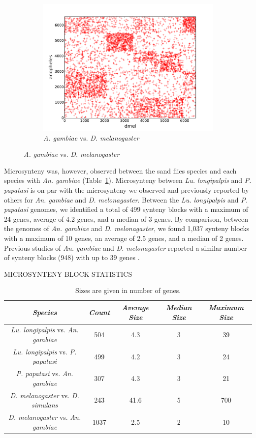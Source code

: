 \begin{figure}[H]
\begin{subfigure}[b]{0.45\textwidth}
    \includegraphics[width=\textwidth]{figures/synteny/dmel_anopheles_plot}
    \caption{\emph{A. gambiae} vs. \emph{D. melanogaster}}
    \label{fig:synteny-dotplots-anopheles-drosophila}
  \end{subfigure}
\label{fig:dot-plots}
\end{figure}

Microsynteny was, however, observed between the sand flies species and each species with \emph{An. gambiae} (Table~\ref{tab:synteny-block-stats}). Microsynteny between \emph{Lu. longipalpis} and \emph{P. papatasi} is on-par with the microsynteny we observed and previously reported by others for \emph{An. gambiae} and \emph{D. melonagaster}.  Between the \emph{Lu. longipalpis} and \emph{P. papatasi} genomes, we identified a total of 499 synteny blocks with a maximum of 24 genes, average of 4.2 genes, and a median of 3 genes. By comparison, between the genomes of \emph{An. gambiae} and \emph{D. melonagaster}, we found 1,037 synteny blocks with a maximum of 10 genes, an average of 2.5 genes, and a median of 2 genes. Previous studies of \emph{An. gambiae} and \emph{D. melonagaster} reported a similar number of synteny blocks (948) with up to 39 genes \cite{Zdobnov2002}.

\begin{table}[H]
  \centering
  \caption{MICROSYNTENY BLOCK STATISTICS}
  \begin{tabular}{c c c c c} \hline
    \emph{Species} & \emph{Count} & \emph{Average Size} & \emph{Median Size} & \emph{Maximum Size} \\ \hline
    \emph{Lu. longipalpis} vs. \emph{An. gambiae} & 504 & 4.3 & 3 & 39 \\
    \emph{Lu. longipalpis} vs. \emph{P. papatasi} & 499 & 4.2 & 3 & 24 \\
    \emph{P. papatasi} vs. \emph{An. gambiae} & 307 & 4.3 & 3 & 21 \\
    \emph{D. melanogaster} vs. \emph{D. simulans} & 243 & 41.6 & 5 & 700 \\
    \emph{D. melanogaster} vs. \emph{An. gambiae} & 1037 & 2.5 & 2 & 10
  \end{tabular}
  \caption*{Sizes are given in number of genes.}
  \label{tab:synteny-block-stats}
\end{table}

